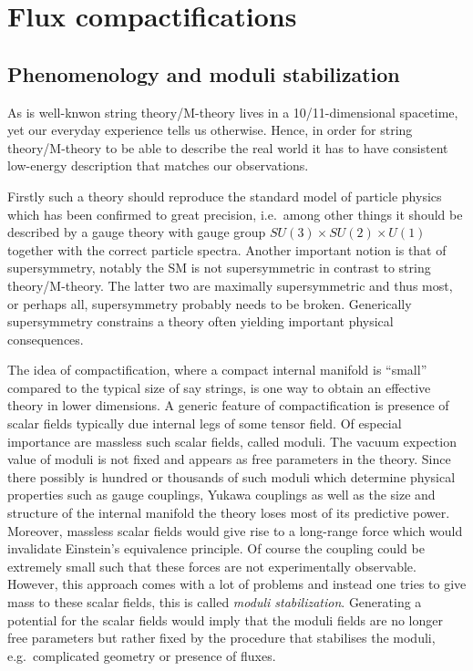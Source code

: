 \chapter{Flux compactifications}

\section{Phenomenology and moduli stabilization}
As is well-knwon string theory/M-theory lives in a 10/11-dimensional spacetime, yet our everyday experience tells us otherwise. Hence, in order for string theory/M-theory to be able to describe the real world it has to have consistent low-energy description that matches our observations. 

Firstly such a theory should reproduce the standard model of particle physics which has been confirmed to great precision, i.e.\ among other things it should be described by a gauge theory with gauge group $SU(3)\times SU(2)\times U(1)$ together with the correct particle spectra. Another important notion is that of supersymmetry, notably the SM is not supersymmetric in contrast to string theory/M-theory. The latter two are maximally supersymmetric and thus most, or perhaps all, supersymmetry probably needs to be broken. Generically supersymmetry constrains a theory often yielding important physical consequences.

The idea of compactification, where a compact internal manifold is ``small'' compared to the typical size of say strings, is one way to obtain an effective theory in lower dimensions. A generic feature of compactification is presence of scalar fields typically due internal legs of some tensor field. Of especial importance are massless such scalar fields, called moduli. The vacuum expection value of moduli is not fixed and appears as free parameters in the theory. Since there possibly is hundred or thousands of such moduli which determine physical properties such as gauge couplings, Yukawa couplings as well as the size and structure of the internal manifold the theory loses most of its predictive power. Moreover, massless scalar fields would give rise to a long-range force which would invalidate Einstein's equivalence principle. Of course the coupling could be extremely small such that these forces are not experimentally observable. However, this approach comes with a lot of problems  and instead one tries to give mass to these scalar fields, this is called \emph{moduli stabilization}. Generating a potential for the scalar fields would imply that the moduli fields are no longer free parameters but rather fixed by the procedure that stabilises the moduli, e.g.\ complicated geometry or presence of fluxes. 

